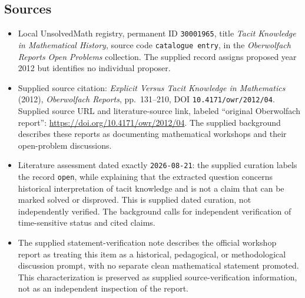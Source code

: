 \documentclass[11pt]{article}
\begin{document}
\subsection{Sources}
\begin{itemize}
\item Local UnsolvedMath registry, permanent ID \texttt{30001965}, title \emph{Tacit Knowledge in Mathematical History}, source code \texttt{catalogue entry}, in the \emph{Oberwolfach Reports Open Problems} collection. The supplied record assigns proposed year 2012 but identifies no individual proposer.
\item Supplied source citation: \emph{Explicit Versus Tacit Knowledge in Mathematics} (2012), \emph{Oberwolfach Reports}, pp.~131--210, DOI \texttt{10.4171/owr/2012/04}. Supplied source URL and literature-source link, labeled ``original Oberwolfach report'': \url{https://doi.org/10.4171/owr/2012/04}. The supplied background describes these reports as documenting mathematical workshops and their open-problem discussions.
\item Literature assessment dated exactly \texttt{2026-08-21}: the supplied curation labels the record \texttt{open}, while explaining that the extracted question concerns historical interpretation of tacit knowledge and is not a claim that can be marked solved or disproved. This is supplied dated curation, not independently verified. The background calls for independent verification of time-sensitive status and cited claims.
\item The supplied statement-verification note describes the official workshop report as treating this item as a historical, pedagogical, or methodological discussion prompt, with no separate clean mathematical statement promoted. This characterization is preserved as supplied source-verification information, not as an independent inspection of the report.
\end{itemize}
\end{document}
